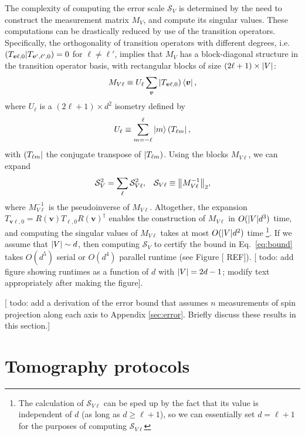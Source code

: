 \documentclass[notitlepage,twocolumn]{revtex4-2}
\newcommand{\p}[1]{\left(#1\right)} %
\renewcommand{\v}{\bm} %
\newcommand{\1}{\mathds{1}}
\renewcommand{\S}{\mathcal{S}}
\def\obra#1{\mathinner{({#1}|}}
\def\oket#1{\mathinner{|{#1})}}
\def\obk#1{\mathinner{({#1})}}
\newcommand{\red}[1]{{\color{red} #1}}
\begin{document}
The complexity of computing the error scale $\S_V$ is determined by the need to construct the measurement matrix $M_V$, and compute its singular values.
These computations can be drastically reduced by use of the transition operators.
Specifically, the orthogonality of transition operators with different degrees, i.e.~$\obk{T_{\v v\ell,0}|T_{\v v',\ell',0}} = 0$ for $\ell\ne\ell'$, implies that $M_V$ has a block-diagonal structure in the transition operator basis, with rectangular blocks of size $\p{2\ell+1}\times\abs{V}$:
\begin{align}
  M_{V\ell} \equiv U_\ell \sum_{\v v} \oket{T_{\v v\ell,0}} \bra{\v v},
\end{align}
where $U_\ell$ is a $\p{2\ell+1}\times d^2$ isometry defined by
\begin{align}
  U_\ell \equiv \sum_{m=-\ell}^\ell \ket{m} \obra{T_{\ell m}},
\end{align}
with $\obra{T_{\ell m}}$ the conjugate transpose of $\oket{T_{\ell m}}$.
Using the blocks $M_{V\ell}$, we can expand
\begin{align}
  \S_V^2 = \sum_\ell \S_{V\ell}^2,
  &&
  \S_{V\ell} \equiv \norm{M_{V\ell}^{-1}}_2,
\end{align}
where $M_{V\ell}^{-1}$ is the pseudoinverse of $M_{V\ell}$.
Altogether, the expansion $T_{\v v\ell,0} = R\p{\v v} T_{\ell,0} R\p{\v v}^\dag$ enables the construction of $M_{V\ell}$ in $O(\abs{V}d^3)$ time, and computing the singular values of $M_{V\ell}$ takes at most $O(\abs{V}d^2)$ time \footnote{The calculation of $\S_{V\ell}$ can be sped up by the fact that its value is independent of $d$ (as long as $d\ge\ell+1$), so we can essentially set $d=\ell+1$ for the purposes of computing $\S_{V\ell}$}.
If we assume that $\abs{V}\sim d$, then computing $\S_V$ to certify the bound in Eq.~\eqref{eq:bound} takes $O(d^5)$ serial or $O(d^4)$ parallel runtime (see Figure [\red{REF}]).
[\red{todo: add figure showing runtimes as a function of $d$ with $\abs{V}=2d-1$; modify text appropriately after making the figure}].

[\red{todo: add a derivation of the error bound that assumes $n$ measurements of spin projection along each axis to Appendix \ref{sec:error}.
  Briefly discuss these results in this section.}]

\section{Tomography protocols}
\label{sec:protocol}
\end{document}
